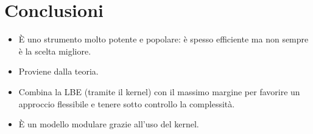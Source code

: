 \section{Conclusioni}

\begin{itemize}
	\item \`E uno strumento molto potente e popolare: \`e spesso efficiente ma non sempre \`e la scelta migliore.
	\item Proviene dalla teoria.
	\item Combina la LBE (tramite il kernel) con il massimo margine per favorire un approccio flessibile e tenere sotto
	      controllo la complessit\`a.
	\item \`E un modello modulare grazie all'uso del kernel.
\end{itemize}